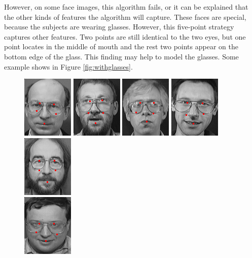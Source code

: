 However, on some face images, this algorithm fails, or it can be explained that the other kinds of features the algorithm will capture. These faces are special, because the subjects are wearing glasses. However, this five-point strategy captures other features. Two points are still identical to the two eyes, but one point locates in the middle of mouth and the rest two points appear on the bottom edge of the glass. This finding may help to model the glasses. Some example shows in \mbox{Figure} \ref{fig:withglasses}.
\begin{figure}[ht]
 \begin{center}
  \includegraphics[width=0.15\columnwidth]{ch3/figures/badglass1.png}
  \includegraphics[width=0.15\columnwidth]{ch3/figures/badglass2.png}
  \includegraphics[width=0.15\columnwidth]{ch3/figures/badglass3.png}
  \includegraphics[width=0.15\columnwidth]{ch3/figures/badglass4.png}
  \includegraphics[width=0.15\columnwidth]{ch3/figures/badglass5.png}\\
  \includegraphics[width=0.15\columnwidth]{ch3/figures/badglass6.png}

\end{center}
\end{figure}
